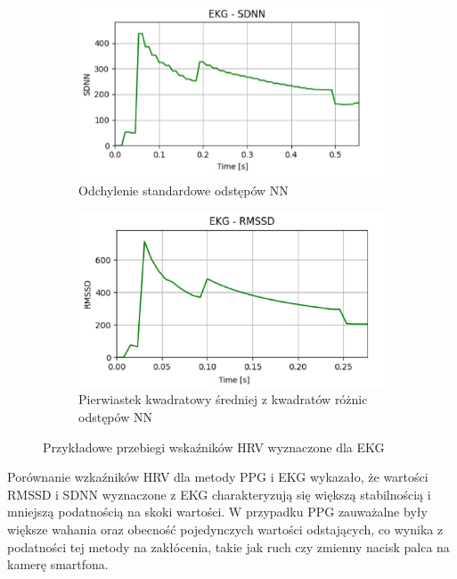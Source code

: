 \documentclass[journal]{IEEEtran}
\begin{document}
{\begin{figure}[h]
   \vspace{0.2cm} 
    \begin{subfigure}{0.49\textwidth}
        \centering
        \includegraphics[width=\linewidth]{SDNN_EKG.png}
        \caption{Odchylenie standardowe odstępów NN}
    \end{subfigure}
    
    \vspace{0.2cm}  
    \begin{subfigure}{0.47\textwidth}
        \centering
        \includegraphics[width=\linewidth]{RMSSD_EKG.png}
        \caption{Pierwiastek kwadratowy średniej z kwadratów różnic  odstępów NN}
    \end{subfigure}  
    \caption{Przykładowe przebiegi wskaźników HRV wyznaczone dla EKG}
\end{figure}

Porównanie wzkaźników HRV dla metody PPG i EKG wykazało, że wartości RMSSD i SDNN wyznaczone z EKG charakteryzują się większą stabilnością i mniejszą podatnością na skoki wartości. W przypadku PPG zauważalne były większe wahania oraz obecność pojedynczych wartości odstających, co wynika z podatności tej metody na zakłócenia, takie jak ruch czy zmienny nacisk palca na kamerę smartfona.

}
\end{document}
